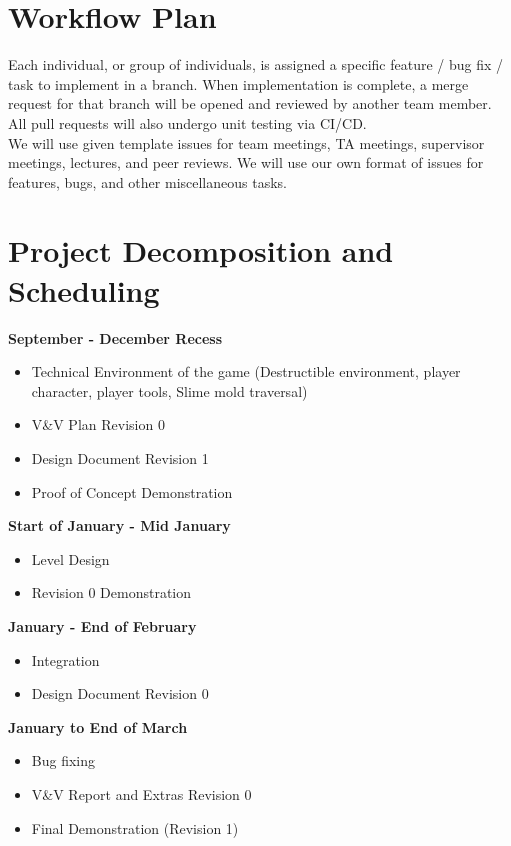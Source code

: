 \documentclass{article}
\begin{document}
\section{Workflow Plan}

Each individual, or group of individuals, is assigned a specific feature / bug fix / task to implement in a branch. When implementation is complete, a merge request for that branch will be opened and reviewed by another team member. All pull requests will also undergo unit testing via CI/CD.\\

We will use given template issues for team meetings, TA meetings, supervisor meetings, lectures, and peer reviews. We will use our own format of issues for features, bugs, and other miscellaneous tasks.\\

\section{Project Decomposition and Scheduling}

\textbf{September - December Recess}
\begin{itemize}
\item{Technical Environment of the game (Destructible environment, player character, player tools, Slime mold traversal)}
\item{V\&V Plan Revision 0}
\item{Design Document Revision 1}
\item{Proof of Concept Demonstration}
\end{itemize}

\textbf{Start of January - Mid January}
\begin{itemize}
\item{Level Design}
\item{Revision 0 Demonstration}
\end{itemize}

\textbf{January - End of February}
\begin{itemize}
\item{Integration}
\item{Design Document Revision 0}
\end{itemize}

\textbf{January to End of March}
\begin{itemize}
\item{Bug fixing}
\item{V\&V Report and Extras Revision 0}
\item{Final Demonstration (Revision 1)}
\end{itemize}
\end{document}
